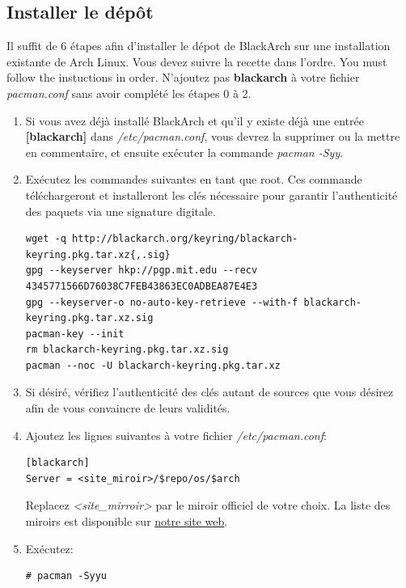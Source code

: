 \documentclass[a4paper, oneside, 11pt]{book}
\begin{document}
\subsection{Installer le dépôt}
Il suffit de 6 étapes afin d'installer le dépot de BlackArch sur une installation
existante de Arch Linux. Vous devez suivre la recette dans l'ordre.
You must follow the instuctions in order. N'ajoutez pas \textbf{blackarch}
à votre fichier \textit{pacman.conf} sans avoir complété les étapes 0 à 2.
\begin{enumerate} \itemsep4pt
\item Si vous avez déjà installé BlackArch et qu'il y existe déjà une entrée
\textbf{[blackarch]} dans \textit{/etc/pacman.conf}, vous devrez la supprimer ou
la mettre en commentaire, et ensuite exécuter la commande \textit{pacman -Syy}.
\item Exécutez les commandes suivantes en tant que root. Ces commande
téléchargeront et installeront les clés nécessaire pour garantir l'authenticité
des paquets via une signature digitale.
{\small
\color{gray}
\begin{verbatim}
wget -q http://blackarch.org/keyring/blackarch-keyring.pkg.tar.xz{,.sig}
gpg --keyserver hkp://pgp.mit.edu --recv 4345771566D76038C7FEB43863EC0ADBEA87E4E3
gpg --keyserver-o no-auto-key-retrieve --with-f blackarch-keyring.pkg.tar.xz.sig
pacman-key --init
rm blackarch-keyring.pkg.tar.xz.sig
pacman --noc -U blackarch-keyring.pkg.tar.xz
\end{verbatim}
}
\item Si désiré, vérifiez l'authenticité des clés autant de sources que vous
désirez afin de vous convaincre de leurs validités.
\item Ajoutez les lignes suivantes à votre fichier \textit{/etc/pacman.conf}:
{\small
\color{gray}
\begin{verbatim}
[blackarch]
Server = <site_miroir>/$repo/os/$arch
\end{verbatim}
}
Replacez \textit{\textless site\_mirroir\textgreater} par le miroir officiel
de votre choix. La liste des miroirs est disponible sur
\href{http://www.blackarch.org/}{notre site web}.

\item Exécutez:
{\small
\color{gray}
\begin{verbatim}
# pacman -Syyu
\end{verbatim}
}
\end{enumerate}
\end{document}
